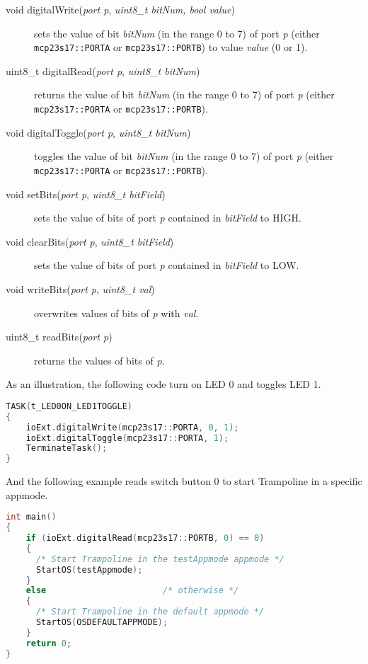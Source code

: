 \documentclass[11pt]{report}
\begin{document}
\begin{description}
    \item[void digitalWrite(\textit{port p}, \textit{uint8\_t bitNum, bool value})] sets the value of bit \textit{bitNum} (in the range 0 to 7) of port \textit{p} (either \texttt{mcp23s17::PORTA} or \texttt{mcp23s17::PORTB}) to value \textit{value} (0 or 1).

    \item[uint8\_t digitalRead(\textit{port p}, \textit{uint8\_t bitNum})] returns the value of bit \textit{bitNum} (in the range 0 to 7) of port \textit{p} (either \texttt{mcp23s17::PORTA} or \texttt{mcp23s17::PORTB}).

    \item[void digitalToggle(\textit{port p}, \textit{uint8\_t bitNum})] toggles the value of bit \textit{bitNum} (in the range 0 to 7) of port \textit{p} (either \texttt{mcp23s17::PORTA} or \texttt{mcp23s17::PORTB}).

    \item[void setBits(\textit{port p}, \textit{uint8\_t bitField})] sets the value of bits of port \textit{p} contained in \textit{bitField} to HIGH.

    \item[void clearBits(\textit{port p}, \textit{uint8\_t bitField})] sets the value of bits of port \textit{p} contained in \textit{bitField} to LOW.

    \item[void writeBits(\textit{port p}, \textit{uint8\_t val})] overwrites values of bits of \textit{p} with \textit{val}.

    \item[uint8_t readBits(\textit{port p})] returns the values of bits of \textit{p}.
\end{description}

As an illustration, the following code turn on LED 0 and toggles LED 1.

\begin{lstlisting}[language=C]
TASK(t_LED0ON_LED1TOGGLE)
{
    ioExt.digitalWrite(mcp23s17::PORTA, 0, 1);
    ioExt.digitalToggle(mcp23s17::PORTA, 1);
    TerminateTask();
}
\end{lstlisting}


And the following example reads switch button {0} to start Trampoline in a specific appmode.

\begin{lstlisting}[language=C]
int main()
{
    if (ioExt.digitalRead(mcp23s17::PORTB, 0) == 0)
    {
      /* Start Trampoline in the testAppmode appmode */
      StartOS(testAppmode);
    }
    else                       /* otherwise */
    {
      /* Start Trampoline in the default appmode */
      StartOS(OSDEFAULTAPPMODE);
    }
    return 0;
}
\end{lstlisting}
\end{document}
